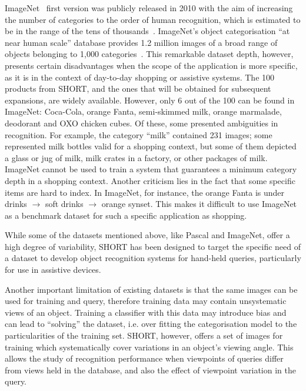 ImageNet~\cite{Deng2009} first version was publicly released in 2010 with the aim of increasing the number of categories to the order of human recognition, which is estimated to be in the range of the tens of thousands~\cite{biederman1987recognition}. ImageNet's object categorisation ``at near human scale'' database provides 1.2 million images of a broad range of objects belonging to 1,000 categories~\cite{Feifei2007}. This remarkable dataset depth, however, presents certain disadvantages when the scope of the application is more specific, as it is in the context of day-to-day shopping or assistive systems. The 100 products from SHORT, and the ones that will be obtained for subsequent expansions, are widely available. However, only 6 out of the 100 can be found in ImageNet: Coca-Cola, orange Fanta, semi-skimmed milk, orange marmalade, deodorant and OXO chicken cubes. Of these, some presented ambiguities in recognition. For example, the category ``milk'' contained 231 images; some represented milk bottles valid for a shopping context, but some of them depicted a glass or jug of milk, milk crates in a factory, or other packages of milk. ImageNet cannot be used to train a system that guarantees a minimum category depth in a shopping context. Another criticism lies in the fact that some specific items are hard to index. In ImageNet, for instance, the orange Fanta is under drinks $\rightarrow$ soft drinks $\rightarrow$ orange synset. This makes it difficult to use ImageNet as a benchmark dataset for such a specific application as shopping.


While some of the datasets mentioned above, like Pascal and ImageNet, offer a high degree of variability, SHORT has been designed to target the specific need of a dataset to develop object recognition systems for hand-held queries, particularly for use in assistive devices.

Another important limitation of existing datasets is that the same images can be used for training and query, therefore training data may contain unsystematic views of an object. Training a classifier with this data may introduce bias and can lead to ``solving'' the dataset, i.e. over fitting the categorisation model to the particularities of the training set. SHORT, however, offers a set of images for training which systematically cover variations in an object's viewing angle. This allows the study of recognition performance when viewpoints of queries differ from views held in the database, and also the effect of viewpoint variation in the query.

